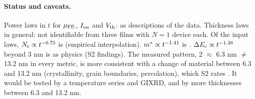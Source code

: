 \paragraph{Status and caveats.}
Power laws in $t$ for $\mu_{\mathrm{FE}}$, $I_{\mathrm{on}}$ and $V_{\mathrm{th}}$:  as descriptions of the data. Thickness laws in general: not identifiable from three films with $N=1$ device each. Of the input laws, $N_{\mathrm{t}}\propto t^{-0.75}$ is  (empirical interpolation). $m^{*}\propto t^{-1.41}$ is . $\Delta E_{\mathrm{c}}\propto t^{-1.38}$ beyond 3 nm is  as physics (S2 findings). The measured pattern, 2 $\approx$ 6.3 nm $\ne$ 13.2 nm in every metric, is more consistent with a change of material between 6.3 and 13.2 nm (crystallinity, grain boundaries, percolation), which S2 rates . It would be tested by a temperature series and GIXRD, and by more thicknesses between 6.3 and 13.2 nm.


